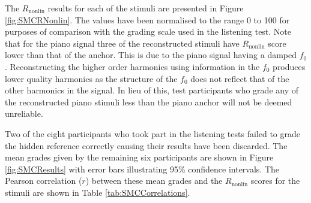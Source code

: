 		The $R_{\mathrm{nonlin}}$ results for each of the stimuli are presented in Figure \ref{fig:SMCRNonlin}. The
		values have been normalised to the range 0 to 100 for purposes of comparison with the grading scale used in
		the listening test. Note that for the piano signal three of the reconstructed stimuli have
		$R_{\mathrm{nonlin}}$ score lower than that of the anchor. This is due to the piano signal having a damped
		$f_{0}$.  Reconstructing the higher order harmonics using information in the $f_{0}$ produces lower quality
		harmonics as the structure of the $f_{0}$ does not reflect that of the other harmonics in the signal. In
		lieu of this, test participants who grade any of the reconstructed piano stimuli less than the piano anchor
		will not be deemed unreliable.
		
		Two of the eight participants who took part in the listening tests failed to grade the hidden reference
		correctly causing their results have been discarded. The mean grades given by the remaining six
		participants are shown in Figure \ref{fig:SMCResults} with error bars illustrating 95\% confidence
		intervals. The Pearson correlation ($r$) between these mean grades and the $R_{\mathrm{nonlin}}$ scores for
		the stimuli are shown in Table \ref{tab:SMCCorrelations}.

